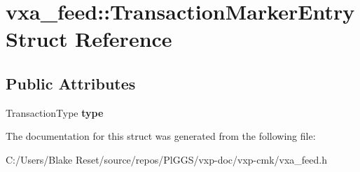 \hypertarget{structvxa__feed_1_1_transaction_marker_entry}{}\section{vxa\+\_\+feed\+::Transaction\+Marker\+Entry Struct Reference}
\label{structvxa__feed_1_1_transaction_marker_entry}
\subsection*{Public Attributes}
\begin{DoxyCompactItemize}
\item 
\mbox{\label{structvxa__feed_1_1_transaction_marker_entry_a848ce66426765aa72a31468ffba25c9c}} 
Transaction\+Type {\bfseries type}
\end{DoxyCompactItemize}


The documentation for this struct was generated from the following file\+:\begin{DoxyCompactItemize}
\item 
C\+:/\+Users/\+Blake Reset/source/repos/\+Pl\+G\+G\+S/vxp-\/doc/vxp-\/cmk/vxa\+\_\+feed.\+h\end{DoxyCompactItemize}

